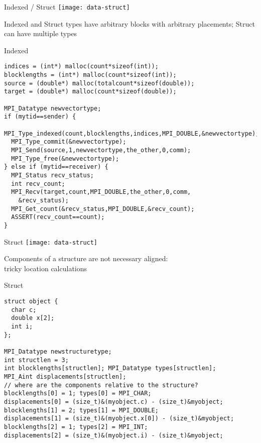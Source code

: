 \begin{frame}{Indexed / Struct}
\texttt{[image: data-struct]}

Indexed and Struct types have arbitrary blocks with arbitrary
placements; Struct can have multiple types
\end{frame}

\begin{frame}[fragile]{Indexed}
\small %
\begin{verbatim}
indices = (int*) malloc(count*sizeof(int));
blocklengths = (int*) malloc(count*sizeof(int));
source = (double*) malloc(totalcount*sizeof(double));
target = (double*) malloc(count*sizeof(double));

MPI_Datatype newvectortype;
if (mytid==sender) {
  MPI_Type_indexed(count,blocklengths,indices,MPI_DOUBLE,&newvectortype);
  MPI_Type_commit(&newvectortype);
  MPI_Send(source,1,newvectortype,the_other,0,comm);
  MPI_Type_free(&newvectortype);
} else if (mytid==receiver) {
  MPI_Status recv_status;
  int recv_count;
  MPI_Recv(target,count,MPI_DOUBLE,the_other,0,comm,
    &recv_status);
  MPI_Get_count(&recv_status,MPI_DOUBLE,&recv_count);
  ASSERT(recv_count==count);
}
\end{verbatim}
\end{frame}

\begin{frame}{Struct}
\texttt{[image: data-struct]}

Components of a structure are not necessary aligned: \\
tricky location calculations
\end{frame}

\begin{frame}[fragile]{Struct}
\small
\begin{verbatim}
struct object {
  char c;
  double x[2];
  int i;
};

MPI_Datatype newstructuretype;
int structlen = 3;
int blocklengths[structlen]; MPI_Datatype types[structlen];
MPI_Aint displacements[structlen];
// where are the components relative to the structure?
blocklengths[0] = 1; types[0] = MPI_CHAR;
displacements[0] = (size_t)&(myobject.c) - (size_t)&myobject;
blocklengths[1] = 2; types[1] = MPI_DOUBLE;
displacements[1] = (size_t)&(myobject.x[0]) - (size_t)&myobject;
blocklengths[2] = 1; types[2] = MPI_INT;
displacements[2] = (size_t)&(myobject.i) - (size_t)&myobject;
\end{verbatim}
\end{frame}

